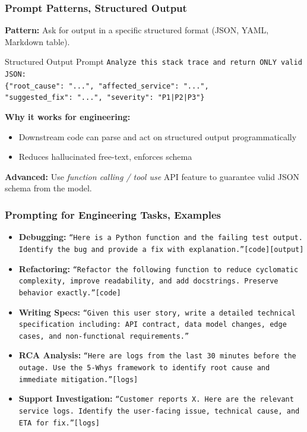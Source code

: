 \begin{frame}[fragile]\frametitle{Prompt Patterns, Structured Output}
\textbf{Pattern:} Ask for output in a specific structured format (JSON, YAML, Markdown table).

\begin{block}{Structured Output Prompt}
\texttt{Analyze this stack trace and return ONLY valid JSON:}\\
\texttt{\{"root\_cause": "...", "affected\_service": "...",}\\
\texttt{"suggested\_fix": "...", "severity": "P1|P2|P3"\}}
\end{block}

\textbf{Why it works for engineering:}
\begin{itemize}
\item Downstream code can parse and act on structured output programmatically
\item Reduces hallucinated free-text, enforces schema
\end{itemize}

\textbf{Advanced:} Use \textit{function calling / tool use} API feature to guarantee valid JSON schema from the model.
\end{frame}

\begin{frame}[fragile]\frametitle{Prompting for Engineering Tasks, Examples}
\begin{itemize}
\item \textbf{Debugging:}
  \texttt{``Here is a Python function and the failing test output. Identify the bug and provide a fix with explanation.''[code][output]}
\item \textbf{Refactoring:}
  \texttt{``Refactor the following function to reduce cyclomatic complexity, improve readability, and add docstrings. Preserve behavior exactly.''[code]}
\item \textbf{Writing Specs:}
  \texttt{``Given this user story, write a detailed technical specification including: API contract, data model changes, edge cases, and non-functional requirements.''}
\item \textbf{RCA Analysis:}
  \texttt{``Here are logs from the last 30 minutes before the outage. Use the 5-Whys framework to identify root cause and immediate mitigation.''[logs]}
\item \textbf{Support Investigation:}
  \texttt{``Customer reports X. Here are the relevant service logs. Identify the user-facing issue, technical cause, and ETA for fix.''[logs]}
\end{itemize}
\end{frame}


